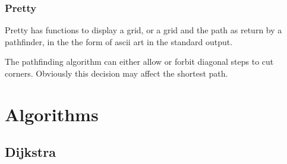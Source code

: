\documentclass[12pt, a4paper]{article}
\begin{document}
\subsubsection{Pretty}

Pretty has functions to display a grid, or a grid and the path as return by
a pathfinder, in the the form of ascii art in the standard output.









The pathfinding algorithm can either allow or forbit diagonal steps to cut
corners. Obviously this decision may affect the shortest path. \cite{astar2}



\section{Algorithms}
\label{Algorithms}


\subsection{Dijkstra}
\end{document}
